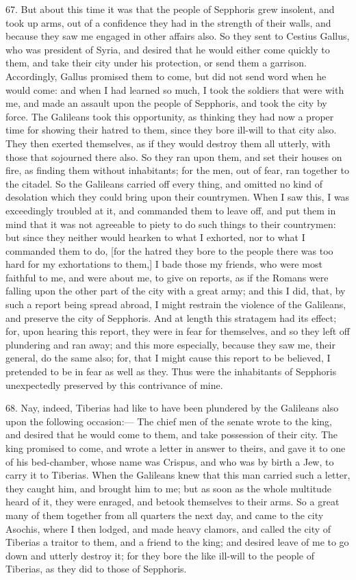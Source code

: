 67. But about this time it was that the people of Sepphoris grew insolent,
and took up arms, out of a confidence they had in the strength of their
walls, and because they saw me engaged in other affairs also. So they sent
to Cestius Gallus, who was president of Syria, and desired that he would
either come quickly to them, and take their city under his protection, or
send them a garrison. Accordingly, Gallus promised them to come, but did
not send word when he would come: and when I had learned so much, I took
the soldiers that were with me, and made an assault upon the people of
Sepphoris, and took the city by force. The Galileans took this
opportunity, as thinking they had now a proper time for showing their
hatred to them, since they bore ill-will to that city also. They then
exerted themselves, as if they would destroy them all utterly, with those
that sojourned there also. So they ran upon them, and set their houses on
fire, as finding them without inhabitants; for the men, out of fear, ran
together to the citadel. So the Galileans carried off every thing, and
omitted no kind of desolation which they could bring upon their
countrymen. When I saw this, I was exceedingly troubled at it, and
commanded them to leave off, and put them in mind that it was not
agreeable to piety to do such things to their countrymen: but since they
neither would hearken to what I exhorted, nor to what I commanded them to
do, [for the hatred they bore to the people there was too hard for my
exhortations to them,] I bade those my friends, who were most faithful to
me, and were about me, to give on reports, as if the Romans were falling
upon the other part of the city with a great army; and this I did, that,
by such a report being spread abroad, I might restrain the violence of the
Galileans, and preserve the city of Sepphoris. And at length this
stratagem had its effect; for, upon hearing this report, they were in fear
for themselves, and so they left off plundering and ran away; and this
more especially, because they saw me, their general, do the same also;
for, that I might cause this report to be believed, I pretended to be in
fear as well as they. Thus were the inhabitants of Sepphoris unexpectedly
preserved by this contrivance of mine.

68. Nay, indeed, Tiberias had like to have been plundered by the Galileans
also upon the following occasion:— The chief men of the senate wrote
to the king, and desired that he would come to them, and take possession
of their city. The king promised to come, and wrote a letter in answer to
theirs, and gave it to one of his bed-chamber, whose name was Crispus, and
who was by birth a Jew, to carry it to Tiberias. When the Galileans knew
that this man carried such a letter, they caught him, and brought him to
me; but as soon as the whole multitude heard of it, they were enraged, and
betook themselves to their arms. So a great many of them together from all
quarters the next day, and came to the city Asochis, where I then lodged,
and made heavy clamors, and called the city of Tiberias a traitor to them,
and a friend to the king; and desired leave of me to go down and utterly
destroy it; for they bore the like ill-will to the people of Tiberias, as
they did to those of Sepphoris.

